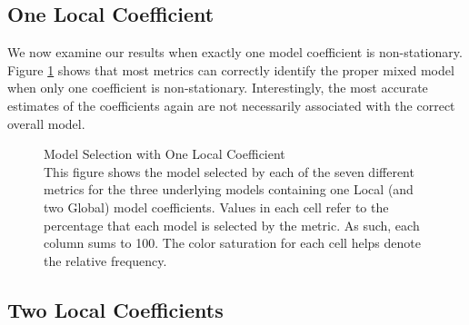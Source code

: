 \documentclass{article}\usepackage[]{graphicx}\usepackage[]{color}
\begin{document}
\subsection{One Local Coefficient}


We now examine our results when exactly one model coefficient is non-stationary. Figure \ref{fig:modelIdentificationOneL} shows that most metrics can correctly identify the proper mixed model when only one coefficient is non-stationary. Interestingly, the most accurate estimates of the coefficients again are not necessarily associated with the correct overall model.



\begin{figure}
\caption{Model Selection with One Local Coefficient \\ This figure shows the model selected by each of the seven different metrics for the three underlying models containing one Local (and two Global) model coefficients. Values in each cell refer to the percentage that each model is selected by the metric. As such, each column sums to 100. The color saturation for each cell helps denote the relative frequency.}
\label{fig:modelIdentificationOneL}
\end{figure}



\subsection{Two Local Coefficients}
\end{document}
